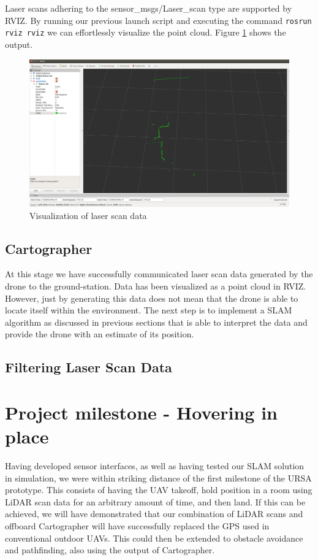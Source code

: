 \documentclass[capstone_report.tex]{subfiles}
\begin{document}
Laser scans adhering to the sensor\_msgs/Laser\_scan type are supported by RVIZ.  By running our previous launch script and executing the command \texttt{rosrun rviz rviz} we can effortlessly visualize the point cloud.  Figure \ref{fig:RVIZ_laser} shows the output.

\begin{figure}[H]
    \centering
    \includegraphics[width=0.8\linewidth]{imgs/laser_scan_rviz.png}
    \caption{Visualization of laser scan data}
    \label{fig:RVIZ_laser}
\end{figure}

\subsection{Cartographer}
At this stage we have successfully communicated laser scan data generated by the drone to the ground-station.  Data has been visualized as a point cloud in RVIZ.  However, just by generating this data does not mean that the drone is able to locate itself within the environment.  The next step is to implement a SLAM algorithm as discussed in previous sections that is able to interpret the data and provide the drone with an estimate of its position.

\subsection{Filtering Laser Scan Data}


\section{Project milestone - Hovering in place}
Having developed sensor interfaces, as well as having tested our SLAM solution in simulation, we were within striking distance of the first milestone of the URSA prototype. This consists of having the UAV takeoff, hold position in a room using LiDAR scan data for an arbitrary amount of time, and then land. If this can be achieved, we will have demonstrated that our combination of LiDAR scans and offboard Cartographer will have successfully replaced the GPS used in conventional outdoor UAVs. This could then be extended to obstacle avoidance and pathfinding, also using the output of Cartographer.\\
\end{document}

